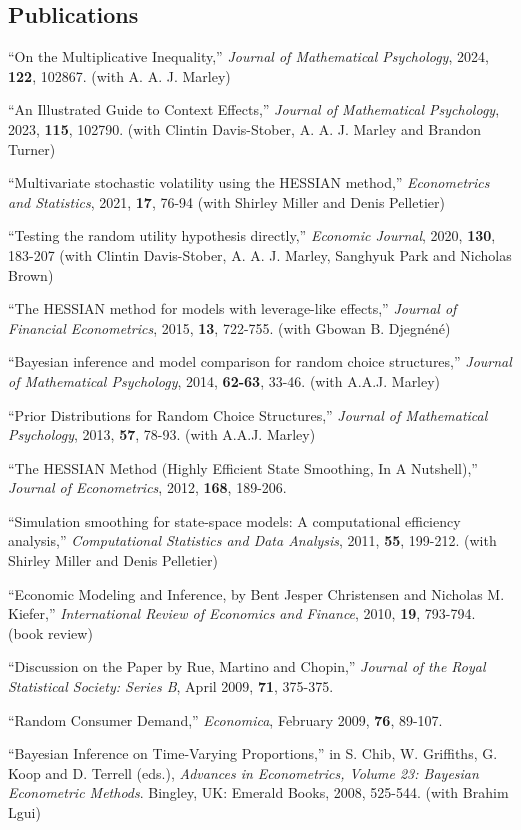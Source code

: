 \documentclass[12pt]{article}
\begin{document}
\subsection*{Publications}

``On the Multiplicative Inequality,''
{\it Journal of Mathematical Psychology}, 2024,
{\bf 122}, 102867.
(with A. A. J. Marley)

``An Illustrated Guide to Context Effects,''
{\it Journal of Mathematical Psychology}, 2023,
{\bf 115}, 102790.
(with Clintin Davis-Stober, A. A. J. Marley and Brandon Turner)

``Multivariate stochastic volatility using the HESSIAN method,''
{\it Econometrics and Statistics}, 2021,
{\bf 17}, 76-94
(with Shirley Miller and Denis Pelletier)

``Testing the random utility hypothesis directly,''
{\it Economic Journal}, 2020,
{\bf 130}, 183-207
(with Clintin Davis-Stober, A. A. J. Marley, Sanghyuk Park and Nicholas Brown)

``The HESSIAN method for models with leverage-like effects,''
{\it Journal of Financial Econometrics}, 2015,
{\bf 13}, 722-755.
(with Gbowan B. Djegn\'en\'e)

``Bayesian inference and model comparison for random choice structures,''
{\it Journal of Mathematical Psychology}, 2014,
{\bf 62-63}, 33-46.
(with A.A.J. Marley)

``Prior Distributions for Random Choice Structures,''
{\it Journal of Mathematical Psychology}, 2013,
{\bf 57}, 78-93.
(with A.A.J. Marley)

``The HESSIAN Method (Highly Efficient State Smoothing, In A Nutshell),''
{\it Journal of Econometrics}, 2012,
{\bf 168}, 189-206.

``Simulation smoothing for state-space models: A computational efficiency analysis,''
{\it Computational Statistics and Data Analysis}, 2011,
{\bf 55}, 199-212.
(with Shirley Miller and Denis Pelletier)

``Economic Modeling and Inference, by Bent Jesper Christensen and Nicholas M. Kiefer,''
{\it International Review of Economics and Finance}, 2010,
{\bf 19}, 793-794.
(book review)

``Discussion on the Paper by Rue, Martino and Chopin,''
{\it Journal of the Royal Statistical Society: Series B}, April 2009,
{\bf 71}, 375-375.

``Random Consumer Demand,'' {\it Economica}, February 2009,
{\bf 76}, 89-107.
 
``Bayesian Inference on Time-Varying Proportions,'' in S. Chib, W. Griffiths, G. Koop and D. Terrell (eds.),
{\it Advances in Econometrics, Volume 23: Bayesian Econometric Methods}.
Bingley, UK: Emerald Books, 2008, 525-544.
(with Brahim Lgui)
\end{document}
